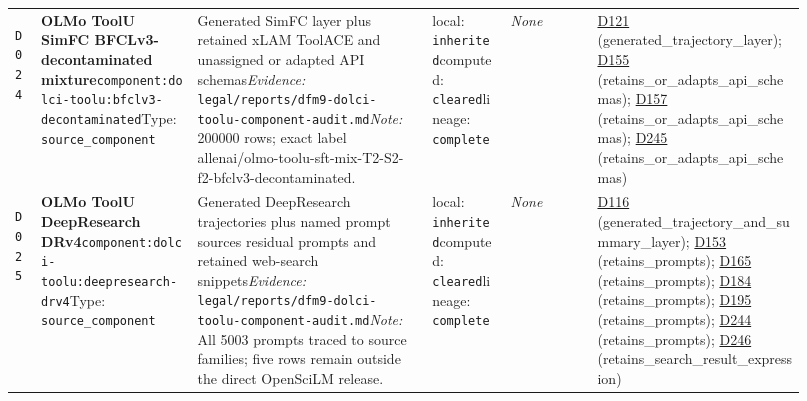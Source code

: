 \documentclass[9pt,a4paper]{article}
\newcommand{\depid}[1]{\hypertarget{dep:#1}{\texttt{#1}}}
\begin{document}
\begin{landscape}
\begin{longtable}{@{}L{0.035\linewidth}L{0.185\linewidth}L{0.27\linewidth}L{0.09\linewidth}L{0.10\linewidth}L{0.24\linewidth}@{}}
\depid{D024} & \textbf{OLMo ToolU SimFC BFCLv3-decontaminated mixture}\newline \nolinkurl{component:dolci-toolu:bfclv3-decontaminated}\newline Type: \texttt{source\_component} & Generated SimFC layer plus retained xLAM ToolACE and unassigned or adapted API schemas\newline \textit{Evidence:} \nolinkurl{legal/reports/dfm9-dolci-toolu-component-audit.md}\newline \textit{Note:} 200000 rows; exact label allenai/olmo-toolu-sft-mix-T2-S2-f2-bfclv3-decontaminated. & local: \texttt{inherited}\newline computed: \texttt{cleared}\newline lineage: \texttt{complete} & \textit{None} & \hyperlink{dep:D121}{D121} (generated\_trajectory\_layer); \hyperlink{dep:D155}{D155} (retains\_or\_adapts\_api\_schemas); \hyperlink{dep:D157}{D157} (retains\_or\_adapts\_api\_schemas); \hyperlink{dep:D245}{D245} (retains\_or\_adapts\_api\_schemas) \\
\depid{D025} & \textbf{OLMo ToolU DeepResearch DRv4}\newline \nolinkurl{component:dolci-toolu:deepresearch-drv4}\newline Type: \texttt{source\_component} & Generated DeepResearch trajectories plus named prompt sources residual prompts and retained web-search snippets\newline \textit{Evidence:} \nolinkurl{legal/reports/dfm9-dolci-toolu-component-audit.md}\newline \textit{Note:} All 5003 prompts traced to source families; five rows remain outside the direct OpenSciLM release. & local: \texttt{inherited}\newline computed: \texttt{cleared}\newline lineage: \texttt{complete} & \textit{None} & \hyperlink{dep:D116}{D116} (generated\_trajectory\_and\_summary\_layer); \hyperlink{dep:D153}{D153} (retains\_prompts); \hyperlink{dep:D165}{D165} (retains\_prompts); \hyperlink{dep:D184}{D184} (retains\_prompts); \hyperlink{dep:D195}{D195} (retains\_prompts); \hyperlink{dep:D244}{D244} (retains\_prompts); \hyperlink{dep:D246}{D246} (retains\_search\_result\_expression) \\

\end{longtable}
\end{landscape}
\end{document}
